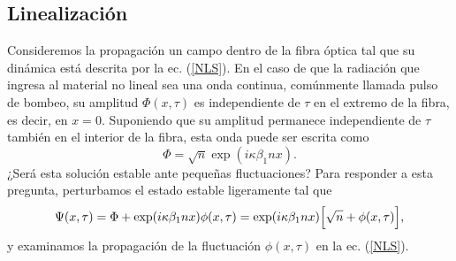 \subsection{Linealizaci\'{o}n}
 Consideremos la propagaci\'{o}n un campo dentro de la fibra \'{o}ptica tal que su din\'{a}mica est\'{a} descrita por la ec. (\ref{NLS}). En el caso de que la radiaci\'{o}n que ingresa al material no lineal sea una onda continua, com\'{u}nmente llamada pulso de bombeo, su amplitud $\Phi(x,\tau)$ es independiente de $\tau$ en el extremo de la fibra, es decir, en $x=0$. Suponiendo que su amplitud permanece independiente de $\tau$ tambi\'{e}n en el interior de la fibra, esta onda puede ser escrita como
 \begin{equation}
 \Phi=\sqrt{n}\exp(i\kappa \beta_1 n x).
 \end{equation}
¿Ser\'{a} esta soluci\'{o}n estable ante peque\~{n}as fluctuaciones? Para responder a esta pregunta, perturbamos el estado estable ligeramente tal que
\begin{equation}\label{antz}
\Psi(x,\tau)=\Phi+\exp(i\kappa \beta_1 n x)\phi(x,\tau)=\exp(i\kappa \beta_1 n x)\Bigl[\sqrt{n}+\phi(x,\tau)\Bigr],
\end{equation} 
y examinamos la propagaci\'{o}n de la fluctuaci\'{o}n $\phi(x,\tau)$ en la ec. (\ref{NLS}).\\

